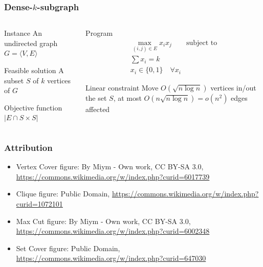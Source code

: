 \documentclass[12pt,aspectratio=169]{beamer}
\begin{document}
\begin{frame}\frametitle{Dense-$k$-subgraph }
\begin{columns} 
  \begin{column}{0.48\textwidth}
  \begin{block}{Instance}
    An undirected  graph $G=\langle V,E \rangle$
  \end{block}
  \begin{block}{Feasible solution}
    A subset $S$ of $k$ vertices of $G$
  \end{block}
  \begin{block}{Objective function}
    $|E\cap S\times S|$
  \end{block}
\end{column}
\begin{column}{0.48\textwidth}
  \begin{block}{Program}
    \begin{equation}
    \begin{split}
      \max_{(i,j)\in E} x_{i}x_{j}\qquad\text{subject to}\\
      \sum x_{i} = k\\
      x_{i}\in \{0, 1\}\quad \forall x_{i}
     \end{split}
   \end{equation}
 \end{block}
 \begin{block}{Linear constraint}
   Move $O(\sqrt{n \log n})$ vertices in/out the set $S$, at most $O(n\sqrt{n \log n}) = o(n^{2})$ edges affected
%
 \end{block}
\end{column}
\end{columns}
\end{frame}

\begin{frame}\frametitle{Attribution}
\small
  \begin{itemize}[<.->]
  \item
    Vertex Cover figure: By Miym - Own work, CC BY-SA 3.0,
    \url{https://commons.wikimedia.org/w/index.php?curid=6017739}
  \item
    Clique figure: Public Domain,
    \url{https://commons.wikimedia.org/w/index.php?curid=1072101}
  \item
    Max Cut figure: By Miym - Own work, CC BY-SA 3.0,
    \url{https://commons.wikimedia.org/w/index.php?curid=6002348}
  \item
    Set Cover figure: Public Domain, \url{https://commons.wikimedia.org/w/index.php?curid=647030}
  \end{itemize}
\end{frame}
\end{document}
